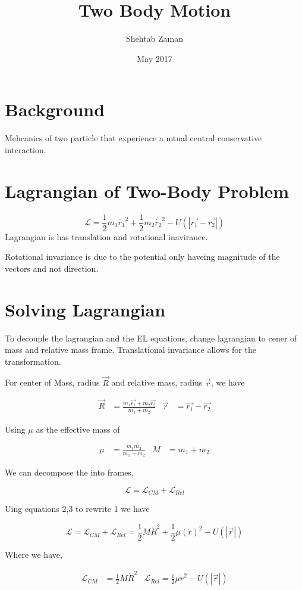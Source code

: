 \documentclass{article}
\title{Two Body Motion}
\author{Shehtab Zaman }
\date{May 2017}
\begin{document}
\maketitle
\section{Background}
Mehcanics of two particle that experience a mtual central conservative interaction.
\section{Lagrangian of Two-Body Problem}
\begin{equation}
  \mathcal{L} = \frac{1}{2}m_1 \dot{r_1}^2 + \frac{1}{2}m_2 \dot{r_2}^2
  -U\left(|\vec{r_1} - \vec{r_2}|\right)
\end{equation}
Lagrangian is has translation and rotational  inavirance.

Rotational invariance is due to the potential only haveing magnitude of the
vectors and not direction.

\section{Solving Lagrangian}
To decouple the lagrangian and the EL equations, change lagrangian to cener of
mass and relative mass frame. Translational invariance allows for the
transformation.


For center of Mass, radius $\vec{R}$ and relative mass, radius $ \vec{r}$, we
have

\begin{align}
\vec{R} &= \frac{m_1 \vec{r_1 } + m_2 \vec{r_2}}{m_1 + m_2}
 &
\vec{r} &= \vec{r_1}-\vec{r_2}
\end{align}

Using $\mu$ as the effective mass of

\begin{align}
  \mu &= \frac{m_1m_2}{m_1+ m_2} &
  M &= m_1 + m_2
\end{align}

We can decompose the into frames,

\begin{equation}
\mathcal{L} = \mathcal{L}_{CM} + \mathcal{L}_{Rel}
\end{equation}

Uing equations 2,3 to rewrite 1 we have

\begin{equation}
\mathcal{L} = \mathcal{L}_{CM} + \mathcal{L}_{Rel}
= \frac{1}{2}M\dot{R}^2 + \frac{1}{2}\mu(\dot{r})^2 - U(|\vec{r}|)
\end{equation}

Where we have,

\begin{align}
\mathcal{L}_{CM} &= \frac{1}{2}M\dot{R}^2 & \mathcal{L}_{Rel} = \frac{1}{2}\mu\dot{r}^2-U(|\vec{r}|)
\end{align}
\end{document}
